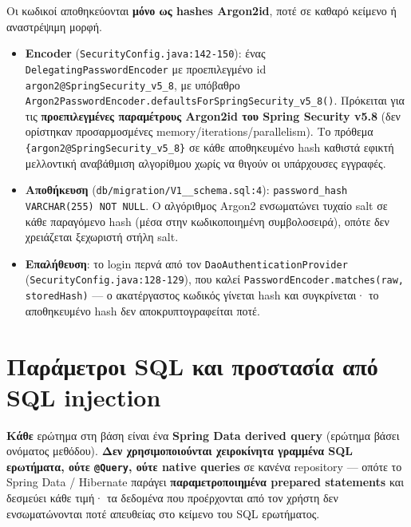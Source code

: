 \documentclass[11pt,a4paper]{article}
\newcommand{\code}[1]{\texttt{#1}}
\begin{document}
Οι κωδικοί αποθηκεύονται \textbf{μόνο ως hashes Argon2id}, ποτέ σε καθαρό κείμενο ή αναστρέψιμη μορφή.

\begin{itemize}[leftmargin=2em]\setlength\itemsep{2pt}
    \item \textbf{Encoder} (\code{SecurityConfig.java:142-150}): ένας \code{DelegatingPasswordEncoder}
          με προεπιλεγμένο id \code{argon2@SpringSecurity\_v5\_8}, με υπόβαθρο
          \code{Argon2PasswordEncoder.\allowbreak{}defaultsFor\allowbreak{}SpringSecurity\_v5\_8()}. Πρόκειται για τις
          \textbf{προεπιλεγμένες παραμέτρους Argon2id του Spring Security v5.8} (δεν ορίστηκαν
          προσαρμοσμένες memory/iterations/parallelism). Το πρόθεμα \code{\{argon2@SpringSecurity\_v5\_8\}}
          σε κάθε αποθηκευμένο hash καθιστά εφικτή μελλοντική αναβάθμιση αλγορίθμου χωρίς να θιγούν οι
          υπάρχουσες εγγραφές.
    \item \textbf{Αποθήκευση} (\code{db/migration/V1\_\_schema.sql:4}):
          \code{password\_hash VARCHAR(255) NOT NULL}. Ο αλγόριθμος Argon2 ενσωματώνει τυχαίο salt σε κάθε παραγόμενο hash (μέσα
          στην κωδικοποιημένη συμβολοσειρά), οπότε δεν χρειάζεται ξεχωριστή στήλη salt.
    \item \textbf{Επαλήθευση}: το login περνά από τον \code{Dao\allowbreak{}AuthenticationProvider}
          (\code{SecurityConfig.java:128-129}), που καλεί \code{Password\allowbreak{}Encoder.\allowbreak{}matches(raw, storedHash)}
          --- ο ακατέργαστος κωδικός γίνεται hash και συγκρίνεται· το αποθηκευμένο hash δεν
          αποκρυπτογραφείται ποτέ.
\end{itemize}

\section{Παράμετροι SQL και προστασία από SQL injection}
\label{sec:sqli}

\textbf{Κάθε} ερώτημα στη βάση είναι ένα \textbf{Spring Data derived query} (ερώτημα βάσει ονόματος
μεθόδου). \textbf{Δεν χρησιμοποιούνται χειροκίνητα γραμμένα SQL ερωτήματα, ούτε \code{@Query}, ούτε native queries} σε κανένα
repository --- οπότε το Spring Data / Hibernate παράγει \textbf{παραμετροποιημένα prepared statements}
και δεσμεύει κάθε τιμή· τα δεδομένα που προέρχονται από τον χρήστη δεν ενσωματώνονται ποτέ απευθείας στο κείμενο του SQL ερωτήματος.
\end{document}
